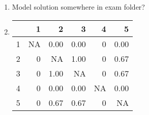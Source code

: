\documentclass[a4paper]{article}
\begin{document}
{\begin{enumerate}
  \begin{itemize}
    \item Tree 1:
    \begin{itemize}
      \item Split 1: left child since $2<3.15 $
      \item End node: Prediction 4.5
    \end{itemize}
    \item Tree 2:
    \begin{itemize}
      \item Split 1: left child since $2<2.1$
      \item Split 2: right child since $2>1.3$
      \item End node: Prediction 2.7
    \end{itemize}
    \item Tree 3:
    \begin{itemize}
      \item Split 1: right child since $2>1.9$
      \item Split 2: left child since $2<3.95$
      \item End node: Prediction 1.7
    \end{itemize}
    Final prediction is the mean of the 3 values: 2.97
  \end{itemize}

  \item Model solution somewhere in exam folder?

  \item

\begin{tabular}{l|r|r|r|r|r}
\hline
  & 1 & 2 & 3 & 4 & 5\\
\hline
1 & NA & 0.00 & 0.00 & 0 & 0.00\\
\hline
2 & 0 & NA & 1.00 & 0 & 0.67\\
\hline
3 & 0 & 1.00 & NA & 0 & 0.67\\
\hline
4 & 0 & 0.00 & 0.00 & NA & 0.00\\
\hline
5 & 0 & 0.67 & 0.67 & 0 & NA\\
\hline
\end{tabular}



\end{enumerate}
}

\end{document}
